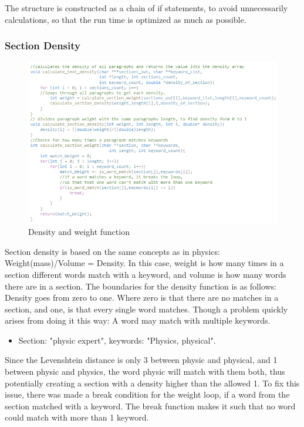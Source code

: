 The structure is constructed as a chain of if statements, to avoid unnecessarily
calculations, so that the run time is optimized as much as possible.\\
\subsubsection{Section Density}
\begin{figure}[H]
  \centering
  \includegraphics[scale = 1]{figures/section_density_v2}
  \caption{Density and weight function}\label{fig:section_density_v2}
\end{figure}
Section density is based on the same concepts as in physics: Weight(mass)/Volume = Density.
In this case, weight is how many times in a section different words match with a keyword, and volume is how many words there
are in a section. The boundaries for the density function is as follows: Density goes from zero to one. 
Where zero is that there are no matches in a section, and one, is that every single word matches. Though a problem quickly arises
from doing it this way: A word may match with multiple keywords.\\
\begin{itemize}
  \item Section: "physic expert", keywords: "Physics, physical".
\end{itemize}
Since the Levenshtein distance is only 3 between physic and physical, and 1 between physic and physics,
the word physic will match with them both, thus potentially creating a section with a density higher than the allowed 1.
To fix this issue, there was made a break condition for the weight loop, if a word from the section matched with a keyword.
The break function makes it such that no word could match with more than 1 keyword.
